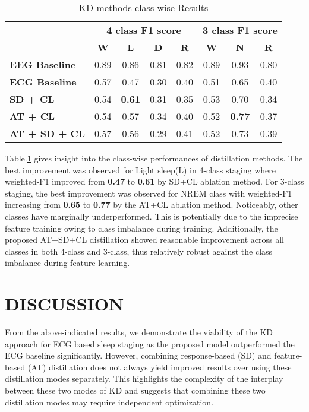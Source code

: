 \documentclass[letterpaper, 10 pt, conference]{ieeeconf}
\begin{document}
\begin{table}[t]
\caption{KD methods class wise Results} \label{Classwise_Table}
\centering
\begin{tabular}{|l|cccc|ccc|}
\hline
\multicolumn{1}{|c|}{\multirow{2}{*}{}} &
  \multicolumn{4}{c|}{\textbf{4 class F1 score}} &
  \multicolumn{3}{c|}{\textbf{3 class F1 score}} \\ \cline{2-8} 
\multicolumn{1}{|c|}{} &
  \multicolumn{1}{c|}{\textbf{W}} &
  \multicolumn{1}{c|}{\textbf{L}} &
  \multicolumn{1}{c|}{\textbf{D}} &
  \textbf{R} &
  \multicolumn{1}{c|}{\textbf{W}} &
  \multicolumn{1}{c|}{\textbf{N}} &
  \textbf{R} \\ \hline
\textbf{EEG Baseline} & 0.89 & 0.86          & 0.81 & 0.82 & 0.89 & 0.93          & 0.80 \\
\textbf{ECG Baseline} & 0.57 & 0.47          & 0.30 & 0.40 & 0.51 & 0.65          & 0.40 \\
\textbf{SD + CL}      & 0.54 & \textbf{0.61} & 0.31 & 0.35 & 0.53 & 0.70          & 0.34 \\
\textbf{AT + CL}      & 0.54 & 0.57          & 0.34 & 0.40 & 0.52 & \textbf{0.77} & 0.37 \\
\textbf{AT + SD + CL} & 0.57 & 0.56          & 0.29 & 0.41 & 0.52 & 0.73          & 0.39 \\ \hline
\end{tabular}
\vspace{-1.9em}
\end{table}
Table.\ref{Classwise_Table} gives insight into the class-wise performances of distillation methods. The best improvement was observed for Light sleep(L) in 4-class staging where weighted-F1 improved from \textbf{0.47} to \textbf{0.61} by SD+CL ablation method. For 3-class staging, the best improvement was observed for NREM class with weighted-F1 increasing from \textbf{0.65} to \textbf{0.77} by the AT+CL ablation method. Noticeably, other classes have marginally underperformed. This is potentially due to the imprecise feature training owing to class imbalance during training. Additionally, the proposed AT+SD+CL distillation showed reasonable improvement across all classes in both 4-class and 3-class, thus relatively robust against the class imbalance during feature learning.
\vspace{-0.5em}
\section{DISCUSSION}
From the above-indicated results, we demonstrate the viability of the KD approach for ECG based sleep staging as the proposed model outperformed the ECG baseline significantly. However, combining response-based (SD) and feature-based (AT) distillation does not always yield improved results over using these distillation modes separately. This highlights the complexity of the interplay between these two modes of KD and suggests that combining these two distillation modes may require independent optimization.
\end{document}
